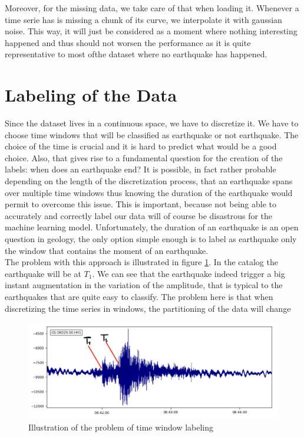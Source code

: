\documentclass[10pt,conference,compsocconf]{IEEEtran}
\begin{document}
Moreover, for the missing data, we take care of that when loading it. Whenever a time serie has is missing a chunk of its curve, we interpolate it with gaussian noise. This way, it will just be considered as a moment where nothing interesting happened and thus should not worsen the performance as it is quite representative to most ofthe dataset where no earthquake has happened.


\section{Labeling of the Data}
Since the dataset lives in a continuous space, we have to discretize it. We have to choose time windows that will be classified as earthquake or not earthquake. The choice of the time is crucial and it is hard to predict what would be a good choice. Also, that gives rise to a fundamental question for the creation of the labels: when does an earthquake end? It is possible, in fact rather probable depending on the length of the discretization process, that an earthquake spans over multiple time windows thus knowing the duration of the earthquake would permit to overcome this issue. This is important, because not being able to accurately and correctly label our data will of course be disastrous for the machine learning model. Unfortunately, the duration of an earthquake is an open question in geology, the only option simple enough is to label as earthquake only the window that contains the moment of an earthquake.\\
The problem with this approach is illustrated in figure \ref{fig:problem-discretization}. In the catalog the earthquake will be at $T_1$. We can see that the earthquake indeed trigger a big instant augmentation in the variation of the amplitude, that is typical to the earthquakes that are quite easy to classify. The problem here is that when discretizing the time series in windows, the partitioning of the data will change

\begin{figure}[h]
  \centering
	\includegraphics[width=\columnwidth]{problem-time-window-labeling.png}
  \caption{Illustration of the problem of time window labeling}
	\label{fig:problem-discretization}
\end{figure}
\end{document}
